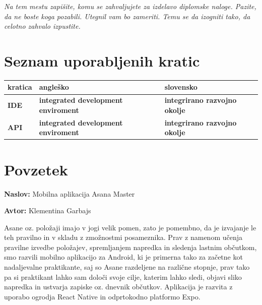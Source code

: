 \documentclass[a4paper, 12pt]{book}
\newcommand{\ttitle}{Mobilna aplikacija Asana Master}
\newcommand{\tauthor}{Klementina Garbajs}
\newcommand{\clearemptydoublepage}{\newpage{\pagestyle{empty}\cleardoublepage}}
\begin{document}
\vspace{2cm}

\clearemptydoublepage

\thispagestyle{empty}\mbox{}\vfill\null\it%
\noindent
Na tem mestu zapišite, komu se zahvaljujete za izdelavo diplomske naloge. Pazite, da ne boste koga pozabili. Utegnil vam bo zameriti. Temu se da izogniti tako, da celotno zahvalo izpustite.
\rm\normalfont

\clearemptydoublepage

\pagestyle{empty}
\def\thepage{}%
\tableofcontents{}

\clearemptydoublepage


\chapter*{Seznam uporabljenih kratic}  %

\noindent\begin{tabular}{p{}|p{}|p{}}    %
  {\bf kratica} & {\bf angleško} & {\bf slovensko} \\ \hline
  {\bf IDE} & {\bf integrated development enviroment} & {\bf integrirano razvojno okolje} \\ \hline
  {\bf API} & {\bf integrated development enviroment} & {\bf integrirano razvojno okolje} \\ \hline
\end{tabular}


\clearemptydoublepage

\chapter*{Povzetek}

\noindent\textbf{Naslov:} \ttitle
\bigskip

\noindent\textbf{Avtor:} \tauthor
\bigskip

\noindent 
Asane oz. položaji imajo v jogi velik pomen, zato je pomembno, da je izvajanje le teh pravilno in v skladu z zmožnostmi posameznika. Prav z namenom učenja pravilne izvedbe položajev, spremljanjem napredka in sledenja lastnim občutkom, smo razvili mobilno aplikacijo za Android, ki je primerna tako za začetne kot nadaljevalne praktikante, saj so Asane razdeljene na različne stopnje, prav tako pa si praktikant lahko sam določi svoje cilje, katerim lahko sledi, objavi sliko napredka in ustvarja zapiske oz. dnevnik občutkov. Aplikacija je razvita z uporabo ogrodja React Native in odprtokodno platformo Expo.
\end{document}
